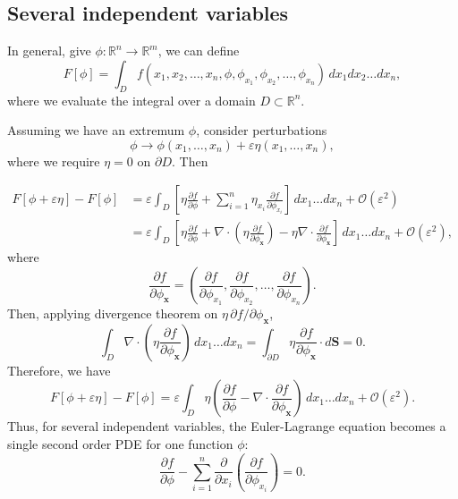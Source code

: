 \documentclass[12pt]{article}
\theoremstyle{definition}
\theoremstyle{remark}
\begin{document}
\subsection{Several independent variables}%
\label{sub:several_independent_variables}

In general, give $\phi : \mathbb{R}^{n} \to \mathbb{R}^{m}$, we can define
\[
	F[\phi] = \int_{D} f(x_1, x_2, \ldots, x_n, \phi, \phi_{x_1}, \phi_{x_2}, \ldots, \phi_{x_n} ) \, dx_1 dx_2 \ldots dx_n
,\]
where we evaluate the integral over a domain $D \subset \mathbb{R}^{n}$.

Assuming we have an extremum $\phi$, consider perturbations
\[
	\phi \to \phi(x_1, \ldots, x_n) + \varepsilon \eta(x_1, \ldots, x_n)
,\]
where we require $\eta = 0$ on $\partial D$. Then

\begin{align*}
	F[\phi + \varepsilon \eta] - F[\phi] &= \varepsilon \int_{D} \left[ \eta \frac{\partial f}{\partial \phi} + \sum_{i = 1}^{n} \eta_{x_i} \frac{\partial f}{\partial \phi_{x_i}} \right] \, dx_1\ldots dx_n + \mathcal{O}(\varepsilon^2) \\
					     &= \varepsilon \int_{D} \left[ \eta \frac{\partial f}{\partial \phi} + \nabla \cdot \left(\eta \frac{\partial f}{\partial \phi_{\mathbf{x}}}\right) - \eta \nabla \cdot \frac{\partial f}{\partial \phi_{\mathbf{x}}} \right]\, dx_1\ldots dx_n + \mathcal{O}(\varepsilon^2)
,\end{align*}
where
\[
\frac{\partial f}{\partial \phi_{\mathbf{x}}} = \left( \frac{\partial f}{\partial \phi_{x_1}}, \frac{\partial f}{\partial \phi_{x_2}}, \ldots, \frac{\partial f}{\partial \phi_{x_n}} \right)
.\]
Then, applying divergence theorem on $\eta \, \partial f/\partial \phi_{\mathbf{x}}$,
\[
	\int_{D} \nabla \cdot \left( \eta \frac{\partial f}{\partial \phi_{\mathbf{x}}} \right) \, dx_1\ldots dx_n = \int_{\partial D} \eta \frac{\partial f}{\partial \phi_{\mathbf{x}}} \cdot d \mathbf{S} = 0
.\]
Therefore, we have
\[
F[\phi + \varepsilon \eta] - F[\phi] = \varepsilon \int_{D} \eta \left( \frac{\partial f}{\partial \phi} - \nabla \cdot \frac{\partial f}{\partial \phi_{\mathbf{x}}} \right)\, dx_1\ldots dx_n + \mathcal{O}(\varepsilon^2)
.\]
Thus, for several independent variables, the Euler-Lagrange equation becomes a single second order PDE for one function $\phi$:
\[
	\frac{\partial f}{\partial \phi} - \sum_{i = 1}^{n} \frac{\partial}{\partial x_i} \left( \frac{\partial f}{\partial \phi_{x_i}}\right) = 0 \tag{3.4}\label{eq:el-e3}
.\]
\end{document}
